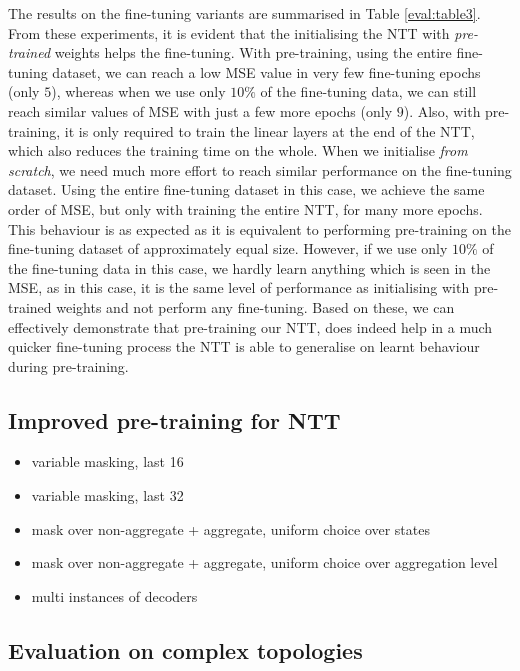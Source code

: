 The results on the fine-tuning variants are summarised in Table \ref{eval:table3}. From these experiments, it is evident that the initialising the NTT with \emph{pre-trained} weights helps the fine-tuning. With pre-training, using the entire fine-tuning dataset, we can reach a low MSE value in very few fine-tuning epochs (only $5$), whereas when we use only $10\%$ of the fine-tuning data, we can still reach similar values of MSE with just a few more epochs (only $9$). Also, with pre-training, it is only required to train the linear layers at the end of the NTT, which also reduces the training time on the whole. When we initialise \emph{from scratch}, we need much more effort to reach similar performance on the fine-tuning dataset. Using the entire fine-tuning dataset in this case, we achieve the same order of MSE, but only with training the entire NTT, for many more epochs. This behaviour is as expected as it is equivalent to performing pre-training on the fine-tuning dataset of approximately equal size. However, if we use only $10\%$ of the fine-tuning data in this case, we hardly learn anything which is seen in the MSE, as in this case, it is the same level of performance as initialising with pre-trained weights and not perform any fine-tuning. Based on these, we can effectively demonstrate that pre-training our NTT, does indeed help in a much quicker fine-tuning process \ie the NTT is able to generalise on learnt behaviour during pre-training.


\subsection{Improved pre-training for NTT}
\label{ssec:impptt}

\begin{itemize}
\item variable masking, last 16
\item variable masking, last 32
\item mask over non-aggregate + aggregate, uniform choice over states
\item mask over non-aggregate + aggregate, uniform choice over aggregation level 
\item multi instances of decoders 
\end{itemize}

\subsection{Evaluation on complex topologies}
\label{ssec:comptop}



